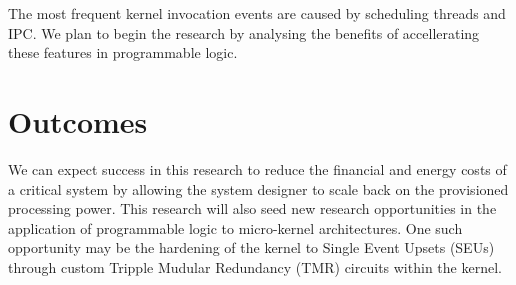 \documentclass[10pt]{article}
\begin{document}
The most frequent kernel invocation events are caused by scheduling threads and IPC. We plan to begin the
research by analysing the benefits of accellerating these features in programmable logic.

\section{Outcomes}
We can expect success in this research to reduce the financial and energy costs of a critical system by
allowing the system designer to scale back on the provisioned processing power. This research will also
seed new research opportunities in the application of programmable logic to micro-kernel architectures.
One such opportunity may be the hardening of the kernel to Single Event Upsets (SEUs) through custom
Tripple Mudular Redundancy (TMR) circuits within the kernel.
\end{document}

